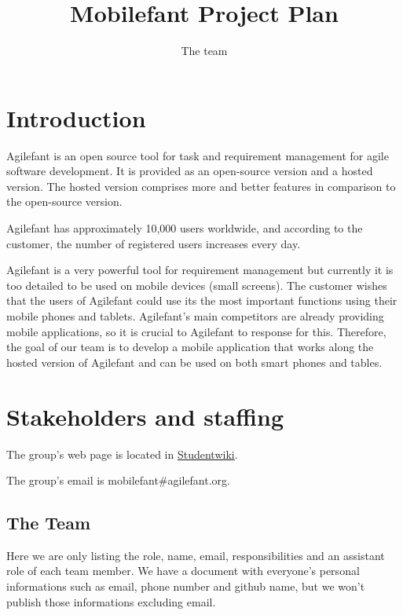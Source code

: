 \documentclass{report}
\begin{document}
\title{Mobilefant Project Plan}
\author{The team}

\maketitle

\chapter{Introduction}
Agilefant is an open source tool for task and requirement management for agile software development. It is provided as an open-source version and a hosted version. The hosted version comprises more and better features in comparison to the open-source version.

Agilefant has approximately 10,000 users worldwide, and according to the customer, the number of registered users increases every day. 
 
Agilefant is a very powerful tool for requirement management but currently it is too detailed to be used on mobile devices (small screens). The customer wishes that the users of Agilefant could use its the most important functions using their mobile phones and tablets. Agilefant's main competitors are already providing mobile applications, so it is crucial to Agilefant to response for this. Therefore, the goal of our team is to develop a mobile application that works along the hosted version of Agilefant and can be used on both smart phones and tables.

\chapter{Stakeholders and staffing}

The group's web page is located in \href{https://studentwiki.aalto.fi/display/MOB/Mobilefant+Home}{Studentwiki}. 

The group's email is mobilefant\#agilefant.org.

\section{The Team}

Here we are only listing the role, name, email, responsibilities and an assistant role of each team member. We have a document with everyone's personal informations such as email, phone number and github name, but we won't publish those informations excluding email.
\end{document}
